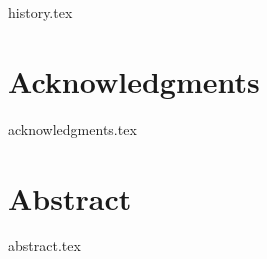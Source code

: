 {history.tex}

\chapter*{Acknowledgments}
{acknowledgments.tex}

\chapter*{Abstract}
{abstract.tex}

\tableofcontents
